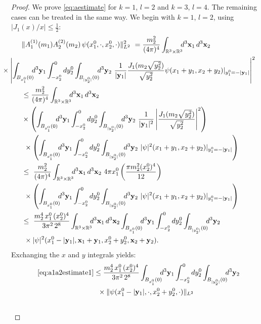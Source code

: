 \documentclass[b5paper,draft,openbib,12pt]{memoir}
\newcommand{\R}{\mathbb{R}}
\newcommand{\vx}{\mathbf{x}}
\newcommand{\vy}{\mathbf{y}}
\begin{document}
\begin{proof}
  We prove \eqref{eq:aestimate} for $k=1$, $ l=2$ and $k=3$, $l=4$. 
  The remaining cases can be treated in the same way. We begin with 
  $k=1$, $l=2$, using $|J_1(x)/x| \leq \frac{1}{2}$:
\begin{align*}
	&\| A_1^{(1)}(m_1) A_2^{(2)}(m_2)\, \psi(x_1^0,\cdot,x_2^0,\cdot) \|^2_{L^2} ~= \frac{m_2^2}{(4\pi)^4} \int_{\R^3 \times \R^3} \!\!\! d^3 \vx_1 \, d^3 \vx_2 \nonumber\\
&\hspace{-1cm}\times \left| \int_{B_{x_1^0}(0)} \!\!\! d^3\vy_1 \int_{-x_2^0}^0 dy_2^0 \int_{B_{|y_2^0|}(0)} \!\!\! d^3 \vy_2 ~\frac{1}{|\vy_1|}  \frac{J_1(m_2\sqrt{y_2^2})}{\sqrt{y_2^2}}\psi(x_1+y_1,x_2+y_2)|_{y^0_1=-|\vy_1|} \right|^2\nonumber\\
&\leq \frac{m_2^2}{(4\pi)^4} \int_{\R^3 \times \R^3}  \!\!\! d^3 \vx_1 \, d^3 \vx_2 \\
&\times \left( \int_{B_{x_1^0}(0)} \!\!\! d^3\vy_1 \int_{-x_2^0}^0 dy_2^0 \int_{B_{|y_2^0|}(0)} \!\!\! d^3 \vy_2~ \frac{1}{|\vy_1|^2} \left| \frac{J_1(m_2\sqrt{y_2^2})}{\sqrt{y_2^2}} \right|^2 \right)\nonumber\\
&~\times \left( \int_{B_{x_1^0}(0)} \!\!\! d^3\vy_1 \int_{-x_2^0}^0 dy_2^0 \int_{B_{|y_2^0|}(0)} \!\!\! d^3 \vy_2 ~|\psi|^2(x_1+y_1,x_2+y_2)|_{y^0_1=-|\vy_1|} \right)\nonumber\\
&\leq~  \frac{m_2^2}{(4\pi)^4} \int_{\R^3 \times \R^3}  \!\!\! d^3 \vx_1 \, d^3 \vx_2 ~4\pi x_1^0 \left( \frac{\pi m_2^2 (x_2^0)^4}{12}\right) \nonumber\\
&~\times \left( \int_{B_{x_1^0}(0)} \!\!\! d^3\vy_1 \int_{-x_2^0}^0 dy_2^0 \int_{B_{|y_2^0|}(0)} \!\!\! d^3 \vy_2 ~|\psi|^2(x_1+y_1,x_2+y_2)|_{y^0_1=-|\vy_1|} \right)\nonumber\\
&\leq~  \frac{m_2^4 \, x_1^0 \,  (x_2^0)^4}{3 \pi^2\, 2^8 } \int_{\R^3 \times \R^3}  \!\!\! d^3 \vx_1 \, d^3 \vx_2  \int_{B_{x_1^0}(0)} \!\!\! d^3\vy_1 \int_{-x_2^0}^0 dy_2^0 \int_{B_{|y_2^0|}(0)} \!\!\! d^3 \vy_2\nonumber\\
&~\times |\psi|^2(x_1^0 - |\vy_1|,\vx_1+\vy_1,x_2^0 + y_2^0,\vx_2+\vy_2).
\label{eq:a1a2estimate1}
\end{align*}
Exchanging the $x$ and $y$ integrals yields:
\begin{align}\nonumber
&\eqref{eq:a1a2estimate1} \leq  \frac{m_2^4 \, x_1^0\,  (x_2^0)^4}{3 \pi^2\, 2^8 } \int_{B_{x_1^0}(0)} \!\!\! d^3\vy_1 \int_{-x_2^0}^0 dy_2^0 \int_{B_{|y_2^0|}(0)} \!\!\! d^3 \vy_2 \\
&\hspace{3cm}\times\| \psi(x_1^0 - |\vy_1|,\cdot,x_2^0 + y_2^0,\cdot)\|_{L^2} \nonumber\\\nonumber

\end{align}
\end{proof}
\end{document}
